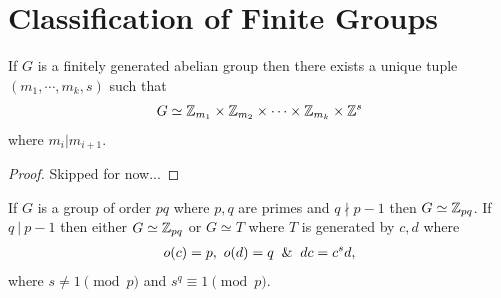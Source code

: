 \section{Classification of Finite Groups}
\begin{theorem}
  If $G$ is a finitely generated abelian group then there exists a unique tuple $(m_1, \cdots, m_k, s)$ such that
  \begin{align*}
    G \simeq \mathbb{Z}_{m_1} \times \mathbb{Z}_{m_2} \times \cdots \times \mathbb{Z}_{m_k} \times \mathbb{Z}^s
  \end{align*}
  where $m_i | m_{i+1}$.
\end{theorem}
\begin{proof}
  Skipped for now...
\end{proof}
\begin{proposition}
  If $G$ is a group of order $pq$ where $p,q$ are primes and $q \nmid p-1$ then $G \simeq \mathbb{Z}_{pq}$. If $q\ |\ p-1$ then either $G \simeq \mathbb{Z}_{pq}$ or $G \simeq T$ where $T$ is generated by $c,d$ where
  \begin{align*}
    o(c) = p,\ o(d) = q \And dc = c^sd,
  \end{align*}
  where $s \neq 1 \pmod{p}$ and $s^q \equiv 1 \pmod{p}$.
\end{proposition}
